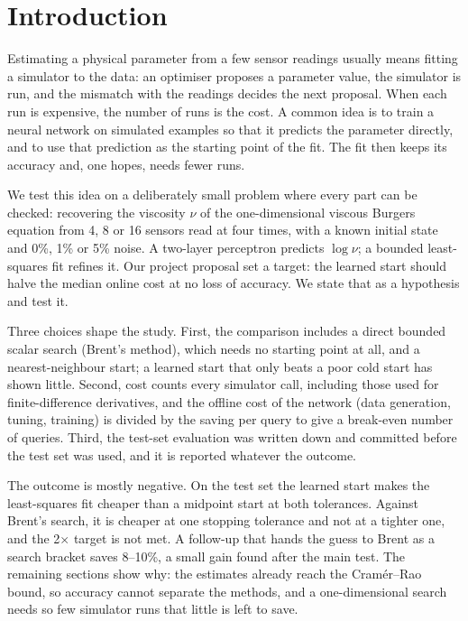 
\section{Introduction}
Estimating a physical parameter from a few sensor readings usually means fitting a simulator to the data:
an optimiser proposes a parameter value, the simulator is run, and the mismatch with the readings decides the
next proposal. When each run is expensive, the number of runs is the cost. A common idea is to train a neural
network on simulated examples so that it predicts the parameter directly, and to use that prediction as the
starting point of the fit. The fit then keeps its accuracy and, one hopes, needs fewer runs.

We test this idea on a deliberately small problem where every part can be checked: recovering the viscosity
$\nu$ of the one-dimensional viscous Burgers equation from 4, 8 or 16 sensors read at four times, with a
known initial state and 0\%, 1\% or 5\% noise. A two-layer perceptron predicts $\log\nu$; a bounded
least-squares fit refines it. Our project proposal set a target: the learned start should halve the median
online cost at no loss of accuracy. We state that as a hypothesis and test it.

Three choices shape the study. First, the comparison includes a direct bounded scalar search (Brent's method),
which needs no starting point at all, and a nearest-neighbour start; a learned start that only beats a poor
cold start has shown little. Second, cost counts every simulator call, including those used for
finite-difference derivatives, and the offline cost of the network (data generation, tuning, training) is
divided by the saving per query to give a break-even number of queries. Third, the test-set evaluation was
written down and committed before the test set was used, and it is reported whatever the outcome.

The outcome is mostly negative. On the test set the learned start makes the least-squares fit cheaper than a
midpoint start at both tolerances. Against Brent's search, it is cheaper at one stopping tolerance and not at a tighter
one, and the 2$\times$ target is not met. A follow-up that hands the guess to Brent as a search bracket saves
8--10\%, a small gain found after the main test. The remaining sections show why: the estimates already reach the
Cram\'er--Rao bound, so accuracy cannot separate the methods, and a one-dimensional search needs so few
simulator runs that little is left to save.

